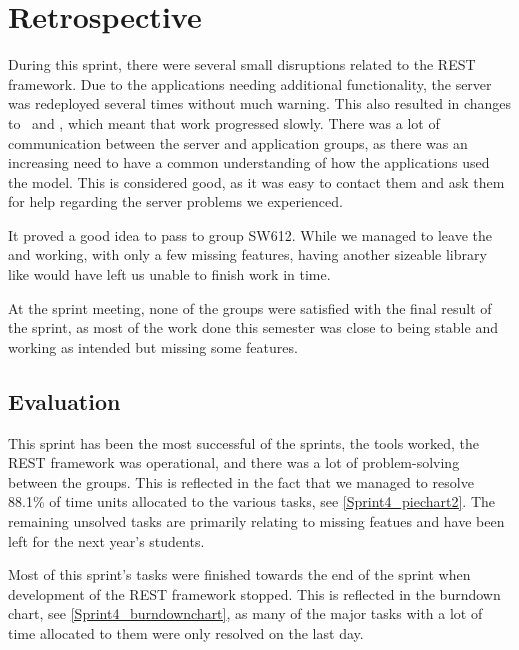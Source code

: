 \section{Retrospective}
During this sprint, there were several small disruptions related to the REST
framework. Due to the applications needing additional functionality, the server
was redeployed several times without much warning. This also resulted in changes to
\rmlib\ and \rlib, which meant that work progressed slowly. There was a lot of
communication between the server and application groups, as there was an
increasing need to have a common understanding of how the applications used the
model. This is considered good, as it was easy to contact them and ask them for
help regarding the server problems we experienced.\nl

It proved a good idea to pass  to group SW612. While we
managed to leave the  and  working,
with only a few missing features, having another sizeable library like
 would have left us unable to finish work in time.\nl

At the sprint meeting, none of the groups were satisfied with the final result
of the sprint, as most of the work done this semester was close to being stable
and working as intended but missing some features.\nl

\subsection{Evaluation}

This sprint has been the most successful of the sprints, the tools worked, the
REST framework was operational, and there was a lot of problem-solving between the
groups.
This is reflected in the fact that we managed to resolve 88.1\% of time units
allocated to the various tasks, see \autoref{Sprint4_piechart2}. The remaining
unsolved tasks are primarily relating to missing featues and have been left for
the next year's students.


Most of this sprint's tasks were finished towards the end of the sprint
when development of the REST framework stopped. This is reflected in the
burndown chart, see \autoref{Sprint4_burndownchart}, as many of the major tasks
with a lot of time allocated to them were only resolved on the last day.


